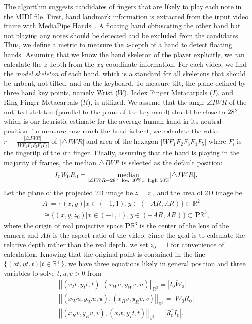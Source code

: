 \documentclass{article}
\begin{document}
The algorithm suggests candidates of fingers that are likely to play each note in the MIDI file. First, hand landmark information is extracted from the input video frame with MediaPipe Hands~\cite{arXiv20Zhang}. A floating hand obfuscating the other hand but not playing any notes should be detected and be excluded from the candidates. Thus, we define a metric to measure the $z$-depth of a hand to detect floating hands. Assuming that we know the hand skeleton of the player explicitly, we can calculate the $z$-depth from the $xy$ coordinate information. For each video, we find the \textit{model skeleton} of each hand, which is a standard for all skeletons that should be unbent, not tilted, and on the keyboard. To measure tilt, the plane defined by three hand key points, namely Wrist ($W$), Index Finger Metacarpals ($I$), and Ring Finger Metacarpals ($R$), is utilized. We assume that the angle $\angle IWR$ of the untilted skeleton (parallel to the plane of the keyboard) should be close to $28\degree$, which is our heuristic estimate for the average human hand in its neutral position. To measure how much the hand is bent, we calculate the ratio $r=\frac{|\triangle IWR|}{|WF_{1}F_{2}F_{3}F_{4}F_{5}|}$ of $|\triangle IWR|$ and area of the hexagon $|WF_{1}F_{2}F_{3}F_{4}F_{5}|$ where $F_i$ is the fingertip of the $i$th finger. Finally, assuming that the hand is playing in the majority of frames, the median $\triangle IWR$ is selected as the default position:
\begin{equation}
    I_{0}W_{0}R_{0}=\underset{|\angle IWR - 28\degree| \text{ low 10\%}, r \text{ high 50\%}}{\text{median}}|\triangle IWR| .
\end{equation}
Let the plane of the projected 2D image be $z=z_{0}$, and the area of 2D image be
\begin{equation}
  \begin{aligned}
    A:=\{(x,y)  | x\in (-1,1), y\in (-AR,AR)\} \subset \mathbb{R}^2
    \\\cong\{(x,y,z_{0})|x\in(-1,1), y\in (-AR,AR)\}\subset \mathbf{P}\mathbb{R}^3 ,
\end{aligned}  
\end{equation}
where the origin of real projective space $\mathbf{P}\mathbb{R}^3$ is the center of the lens of the camera and $AR$ is the aspect ratio of the video. Since the goal is to calculate the relative depth rather than the real depth, we set $z_{0}=1$ for convenience of calculation.
Knowing that the original point is contained in the line $\{(xt,yt,t) | t\in \mathbb{R^{+}}\}$, we have three equations likely in general position and three variables to solve $t,u,v>0$ from
\begin{gather}
    \left||(x_{I}t,y_{I}t,t),(x_{W}u,y_{W}u,u)|\right|_{\mathbb{R}^3}=\left|\overline{I_{0}W_{0}}\right| \\
    \left||(x_{W}u,y_{W}u,u),(x_{R}v,y_{R}v,v)|\right|_{\mathbb{R}^3}=\left|\overline{W_{0}R_{0}}\right| \\
    \left||(x_{R}v,y_{R}v,v),(x_{I}t,y_{I}t,t)|\right|_{\mathbb{R}^3}=\left|\overline{R_{0}I_{0}}\right|.
\end{gather}
\end{document}
